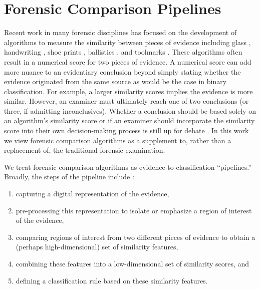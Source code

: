 \documentclass[11pt,]{isuthesis}
\begin{document}
\hypertarget{forensic-comparison-pipelines}{%
\section{Forensic Comparison Pipelines}\label{forensic-comparison-pipelines}}

Recent work in many forensic disciplines has focused on the development of algorithms to measure the similarity between pieces of evidence including glass \citep{Curran2000-hp,Park2019,openForSciR}, handwriting \citep{crawford_handwriting_2020}, shoe prints \citep{park_algorithm_2020}, ballistics \citep{hare_automatic_2016,tai_fully_2018}, and toolmarks \citep{Hadler2017,Krishnan2018}.
These algorithms often result in a numerical score for two pieces of evidence.
A numerical score can add more nuance to an evidentiary conclusion beyond simply stating whether the evidence originated from the same source as would be the case in binary classification.
For example, a larger similarity scores implies the evidence is more similar.
However, an examiner must ultimately reach one of two conclusions (or three, if admitting inconclusives).
Whether a conclusion should be based solely on an algorithm's similarity score or if an examiner should incorporate the similarity score into their own decision-making process is still up for debate \citep{Swofford2021}.
In this work we view forensic comparison algorithms as a supplement to, rather than a replacement of, the traditional forensic examination.

We treat forensic comparison algorithms as evidence-to-classification ``pipelines.''
Broadly, the steps of the pipeline include \citet{Rice2020}:

\begin{enumerate}
\def\labelenumi{\arabic{enumi}.}
\item
  capturing a digital representation of the evidence,
\item
  pre-processing this representation to isolate or emphasize a region of interest of the evidence,
\item
  comparing regions of interest from two different pieces of evidence to obtain a (perhaps high-dimensional) set of similarity features,
\item
  combining these features into a low-dimensional set of similarity scores, and
\item
  defining a classification rule based on these similarity features.
\end{enumerate}
\end{document}
